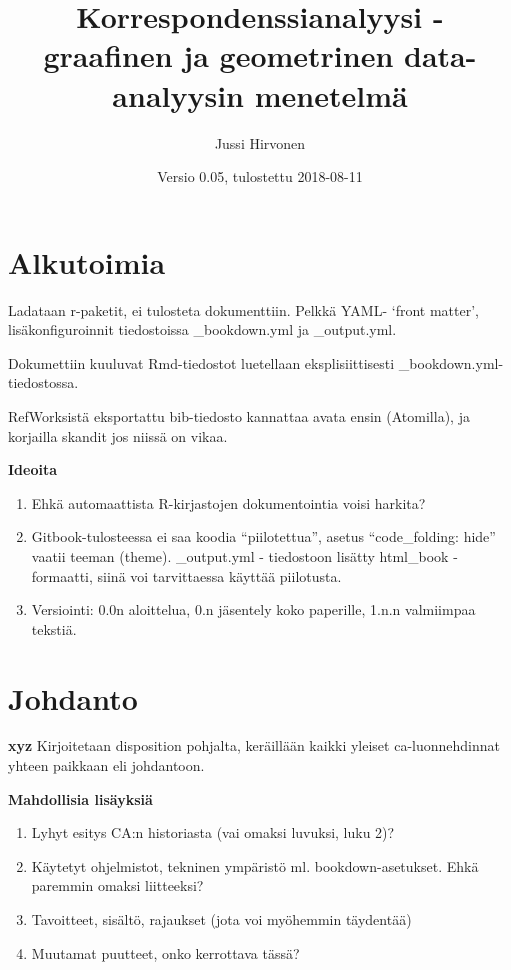 \documentclass[finnish,]{book}
\title{Korrespondenssianalyysi - graafinen ja geometrinen data-analyysin
menetelmä}
\author{Jussi Hirvonen}
\date{Versio 0.05, tulostettu 2018-08-11}
\theoremstyle{definition}
\theoremstyle{definition}
\theoremstyle{definition}
\theoremstyle{remark}
\begin{document}
\maketitle

{
\setcounter{tocdepth}{1}
\tableofcontents
}
\hypertarget{alkutoimia}{%
\chapter*{Alkutoimia}\label{alkutoimia}}

Ladataan r-paketit, ei tulosteta dokumenttiin. Pelkkä YAML- `front
matter', lisäkonfiguroinnit tiedostoissa \_bookdown.yml ja \_output.yml.

Dokumettiin kuuluvat Rmd-tiedostot luetellaan eksplisiittisesti
\_bookdown.yml-tiedostossa.

RefWorksistä eksportattu bib-tiedosto kannattaa avata ensin (Atomilla),
ja korjailla skandit jos niissä on vikaa.

\textbf{Ideoita}

\begin{enumerate}
\def\labelenumi{\arabic{enumi}.}
\item
  Ehkä automaattista R-kirjastojen dokumentointia voisi harkita?
\item
  Gitbook-tulosteessa ei saa koodia ``piilotettua'', asetus
  ``code\_folding: hide'' vaatii teeman (theme). \_output.yml -
  tiedostoon lisätty html\_book - formaatti, siinä voi tarvittaessa
  käyttää piilotusta.
\item
  Versiointi: 0.0n aloittelua, 0.n jäsentely koko paperille, 1.n.n
  valmiimpaa tekstiä.
\end{enumerate}

\hypertarget{johdanto}{%
\chapter{Johdanto}\label{johdanto}}

\textbf{xyz} Kirjoitetaan disposition pohjalta, keräillään kaikki
yleiset ca-luonnehdinnat yhteen paikkaan eli johdantoon.

\textbf{Mahdollisia lisäyksiä}

\begin{enumerate}
\def\labelenumi{\arabic{enumi}.}
\item
  Lyhyt esitys CA:n historiasta (vai omaksi luvuksi, luku 2)?
\item
  Käytetyt ohjelmistot, tekninen ympäristö ml. bookdown-asetukset. Ehkä
  paremmin omaksi liitteeksi?
\item
  Tavoitteet, sisältö, rajaukset (jota voi myöhemmin täydentää)
\item
  Muutamat puutteet, onko kerrottava tässä?
\end{enumerate}
\end{document}
